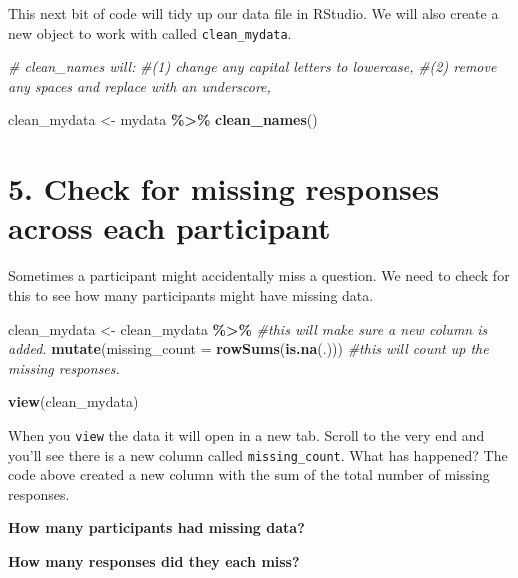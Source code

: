 \documentclass[
]{book}
\newenvironment{Shaded}{\begin{snugshade}}{\end{snugshade}}
\newcommand{\AttributeTok}[1]{\textcolor[rgb]{0.13,0.29,0.53}{#1}}
\newcommand{\CommentTok}[1]{\textcolor[rgb]{0.56,0.35,0.01}{\textit{#1}}}
\newcommand{\FunctionTok}[1]{\textcolor[rgb]{0.13,0.29,0.53}{\textbf{#1}}}
\newcommand{\NormalTok}[1]{#1}
\newcommand{\OtherTok}[1]{\textcolor[rgb]{0.56,0.35,0.01}{#1}}
\newcommand{\SpecialCharTok}[1]{\textcolor[rgb]{0.81,0.36,0.00}{\textbf{#1}}}
\let\oldsection\section
\renewcommand{\section}{\needspace{5\baselineskip}\oldsection}
\begin{document}
This next bit of code will tidy up our data file in RStudio.
We will also create a new object to work with called \texttt{clean\_mydata}.

\begin{Shaded}
\begin{Highlighting}[]
\CommentTok{\# clean\_names will:}
\CommentTok{\#(1) change any capital letters to lowercase, }
\CommentTok{\#(2) remove any spaces and replace with an underscore,}

\NormalTok{clean\_mydata }\OtherTok{\textless{}{-}}\NormalTok{ mydata }\SpecialCharTok{\%\textgreater{}\%}
  \FunctionTok{clean\_names}\NormalTok{()}
\end{Highlighting}
\end{Shaded}

\section{\texorpdfstring{\textbf{5. Check for missing responses across each participant}}{5. Check for missing responses across each participant}}\label{check-for-missing-responses-across-each-participant}

Sometimes a participant might accidentally miss a question.
We need to check for this to see how many participants might have missing data.

\begin{Shaded}
\begin{Highlighting}[]
\NormalTok{clean\_mydata }\OtherTok{\textless{}{-}}\NormalTok{ clean\_mydata }\SpecialCharTok{\%\textgreater{}\%}               \CommentTok{\#this will make sure a new column is added.}
  \FunctionTok{mutate}\NormalTok{(}\AttributeTok{missing\_count =} \FunctionTok{rowSums}\NormalTok{(}\FunctionTok{is.na}\NormalTok{(.)))    }\CommentTok{\#this will count up the missing responses.}

\FunctionTok{view}\NormalTok{(clean\_mydata)}
\end{Highlighting}
\end{Shaded}

When you \texttt{view} the data it will open in a new tab.
Scroll to the very end and you'll see there is a new column called \texttt{missing\_count}.
What has happened?
The code above created a new column with the sum of the total number of missing responses.

\textbf{How many participants had missing data?}

\textbf{How many responses did they each miss?}
\end{document}
